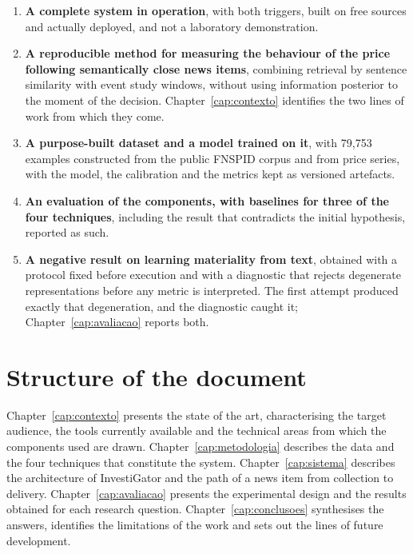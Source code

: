 \begin{enumerate}
  \item \textbf{A complete system in operation}, with both triggers, built on free sources and
        actually deployed, and not a laboratory demonstration.
  \item \textbf{A reproducible method for measuring the behaviour of the price following
        semantically close news items}, combining retrieval by sentence similarity with event
        study windows, without using information posterior to the moment of the decision.
        Chapter~\ref{cap:contexto} identifies the two lines of work from which they come.
  \item \textbf{A purpose-built dataset and a model trained on it}, with 79{,}753 examples
        constructed from the public \gls{FNSPID} corpus \autocite{dong2024fnspid} and from price
        series, with the model, the calibration and the metrics kept as versioned artefacts.
  \item \textbf{An evaluation of the components, with baselines for three of the four techniques}, including the
        result that contradicts the initial hypothesis, reported as such.
  \item \textbf{A negative result on learning materiality from text}, obtained with a protocol
        fixed before execution and with a diagnostic that rejects degenerate representations
        before any metric is interpreted. The first attempt produced exactly that degeneration,
        and the diagnostic caught it; Chapter~\ref{cap:avaliacao} reports both.
\end{enumerate}

\section{Structure of the document}
\label{sec:intro_estrutura}

Chapter~\ref{cap:contexto} presents the state of the art, characterising the target audience, the
tools currently available and the technical areas from which the components used are drawn.
Chapter~\ref{cap:metodologia} describes the data and the four techniques that constitute the
system. Chapter~\ref{cap:sistema} describes the architecture of InvestiGator and the path of a news
item from collection to delivery. Chapter~\ref{cap:avaliacao} presents the experimental design and
the results obtained for each research question. Chapter~\ref{cap:conclusoes} synthesises the
answers, identifies the limitations of the work and sets out the lines of future development.

